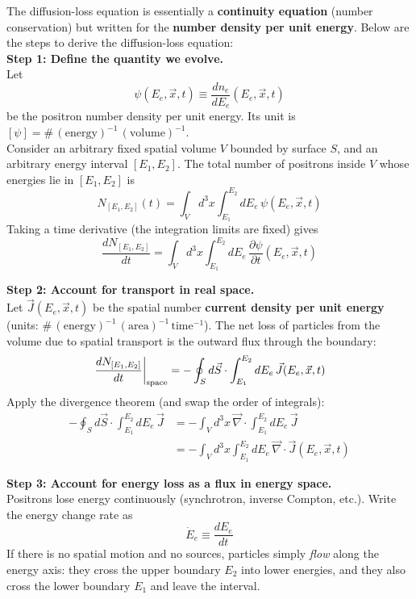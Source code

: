 \bigskip \noindent
\begin{foundation}

    The diffusion-loss equation is essentially a \textbf{continuity equation} (number conservation) but written for the \textbf{number density per unit energy}. Below are the steps to derive the diffusion-loss equation: \\

    \textbf{Step 1: Define the quantity we evolve.} \\
    Let
    \[
        \psi(E_e, \vec{x}, t) \equiv \frac{d n_e}{dE_e}(E_e, \vec{x}, t)
    \]
    be the positron number density per unit energy. Its unit is $[\psi] = \#\,\mathrm{(energy)}^{-1}\,\mathrm{(volume)}^{-1}$. \\

    Consider an arbitrary fixed spatial volume $V$ bounded by surface $S$, and an arbitrary energy interval $[E_1,E_2]$. The total number of positrons inside $V$ whose energies lie in $[E_1,E_2]$ is
    \[
        N_{[E_1,E_2]}(t) = \int_V d^3x \int_{E_1}^{E_2} dE_e\, \psi(E_e, \vec{x}, t)
    \]
    Taking a time derivative (the integration limits are fixed) gives
    \[
        \frac{dN_{[E_1,E_2]}}{dt} = \int_V d^3x \int_{E_1}^{E_2} dE_e\, \frac{\partial \psi}{\partial t}(E_e, \vec{x}, t)
    \]

    \textbf{Step 2: Account for transport in real space.} \\
    Let $\vec{J}(E_e, \vec{x}, t)$ be the spatial number \textbf{current density per unit energy} (units: $\#\,\mathrm{(energy)}^{-1}\,\mathrm{(area)}^{-1}\,\mathrm{time}^{-1}$). The net loss of particles from the volume due to spatial transport is the outward flux through the boundary:
    \[
        \left.\frac{dN_{[E_1,E_2]}}{dt}\right|_{\rm space}
        = - \oint_S d\vec{S}\cdot \int_{E_1}^{E_2} dE_e\, \vec{J}(E_e, \vec{x}, t)
    \]
    Apply the divergence theorem (and swap the order of integrals):
    \begin{align*}
        - \oint_S d\vec{S}\cdot \int_{E_1}^{E_2} dE_e\, \vec{J}
        &= - \int_V d^3x\, \vec{\nabla}\cdot \int_{E_1}^{E_2} dE_e\, \vec{J} \\
        &= - \int_V d^3x\int_{E_1}^{E_2} dE_e\, \vec{\nabla}\cdot \vec{J}(E_e, \vec{x}, t)
    \end{align*}

    \textbf{Step 3: Account for energy loss as a flux in energy space.} \\
    Positrons lose energy continuously (synchrotron, inverse Compton, etc.). Write the energy change rate as
    \[
        \dot{E}_e \equiv \frac{dE_e}{dt}
    \]
    If there is no spatial motion and no sources, particles simply \emph{flow} along the energy axis: they cross the upper boundary $E_2$ into lower energies, and they also cross the lower boundary $E_1$ and leave the interval.


\end{foundation}
